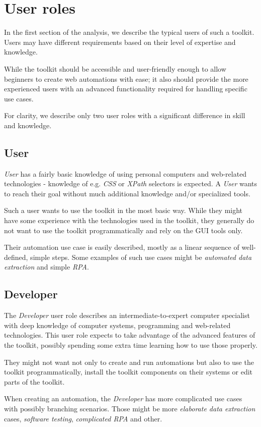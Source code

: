\section{User roles} \label{userroles}

In the first section of the analysis, we describe the typical users of such a toolkit.
Users may have different requirements based on their level of expertise and knowledge.

While the toolkit should be accessible and user-friendly enough to allow beginners to
create web automations with ease; it also should provide the more experienced users with 
an advanced functionality required for handling specific use cases. 

For clarity, we describe only two user roles with a significant difference in skill and knowledge. 

\subsection{User} \label{UserUserRole}
\textit{User} has a fairly basic knowledge of using personal computers 
and web-related technologies - knowledge of e.g. \textit{CSS} or \textit{XPath} selectors is expected.
A \textit{User} wants to reach their goal without much additional knowledge and/or specialized tools.

Such a user wants to use the toolkit in the most basic way.
While they might have some experience with the technologies used in the toolkit, they generally do not want to use the toolkit programmatically and rely on the \ac{GUI} tools only.

Their automation use case is easily described, mostly as a linear sequence of well-defined, simple steps.
Some examples of such use cases might be \textit{automated data extraction} and simple \textit{\acl{RPA}}.


\subsection{Developer} \label{DevUserRole}
The \textit{Developer} user role describes an intermediate-to-expert computer specialist with deep
knowledge of computer systems, programming and web-related technologies.
This user role expects to take advantage of the advanced features of the toolkit, possibly spending some extra time learning how to use those properly.

They might not want not only to create and run automations but also to use the toolkit programmatically, 
install the toolkit components on their systems or edit parts of the toolkit. 

When creating an automation, the \textit{Developer} has more complicated use cases with possibly branching scenarios. 
Those might be more \textit{elaborate data extraction} cases, \textit{software testing}, \textit{complicated \ac{RPA}} and other.